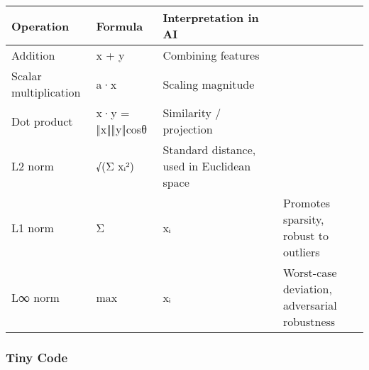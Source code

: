 \documentclass[
  letterpaper,
  DIV=11,
  numbers=noendperiod]{scrreprt}
\begin{document}
\begin{longtable}[]{@{}
  >{\raggedright\arraybackslash}p{}
  >{\raggedright\arraybackslash}p{}
  >{\raggedright\arraybackslash}p{}
  >{\raggedright\arraybackslash}p{}
  >{\raggedright\arraybackslash}p{}@{}}
\toprule\noalign{}
\begin{minipage}[b]{\linewidth}\raggedright
Operation
\end{minipage} & \begin{minipage}[b]{\linewidth}\raggedright
Formula
\end{minipage} & \begin{minipage}[b]{\linewidth}\raggedright
Interpretation in AI
\end{minipage} & \begin{minipage}[b]{\linewidth}\raggedright
\end{minipage} & \begin{minipage}[b]{\linewidth}\raggedright
\end{minipage} \\
\midrule\noalign{}
\endhead
\bottomrule\noalign{}
\endlastfoot
Addition & x + y & Combining features & & \\
Scalar multiplication & a·x & Scaling magnitude & & \\
Dot product & x·y = ‖x‖‖y‖cosθ & Similarity / projection & & \\
L2 norm & √(Σ xᵢ²) & Standard distance, used in Euclidean space & & \\
L1 norm & Σ & xᵢ & & Promotes sparsity, robust to outliers \\
L∞ norm & max & xᵢ & & Worst-case deviation, adversarial robustness \\
\end{longtable}

\subsubsection{Tiny Code}\label{tiny-code-101}
\end{document}
